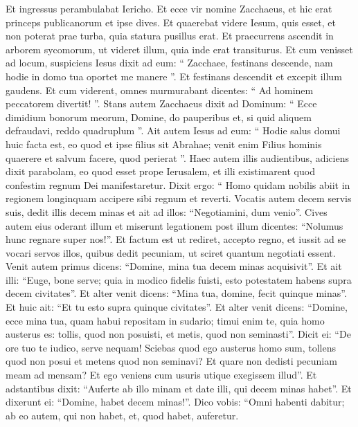 \begin{biblechapter}
\begin{biblechapter}
\begin{biblechapter}
\begin{biblechapter}
\begin{biblechapter}
\begin{biblechapter}
\begin{biblechapter}
\begin{biblechapter}
\begin{biblechapter}
\begin{biblechapter}
\begin{biblechapter}
\begin{biblechapter}
\begin{biblechapter}
\begin{biblechapter}
\begin{biblechapter}
\begin{biblechapter}
\begin{biblechapter}
\begin{biblechapter}
\begin{biblechapter}
\verse Et ingressus perambulabat Iericho. 
\verse Et ecce vir nomine Zacchaeus, et hic erat princeps publicanorum et ipse dives. 
\verse Et quaerebat videre Iesum, quis esset, et non poterat prae turba, quia statura pusillus erat. 
\verse Et praecurrens ascendit in arborem sycomorum, ut videret illum, quia inde erat transiturus. 
\verse Et cum venisset ad locum, suspiciens Iesus dixit ad eum: “ Zacchaee, festinans descende, nam hodie in domo tua oportet me manere ”. 
\verse Et festinans descendit et excepit illum gaudens. 
\verse Et cum viderent, omnes murmurabant dicentes: “ Ad hominem peccatorem divertit! ”. 
\verse Stans autem Zacchaeus dixit ad Dominum: “ Ecce dimidium bonorum meorum, Domine, do pauperibus et, si quid aliquem defraudavi, reddo quadruplum ”. 
\verse Ait autem Iesus ad eum: “ Hodie salus domui huic facta est, eo quod et ipse filius sit Abrahae; 
\verse venit enim Filius hominis quaerere et salvum facere, quod perierat ”.
 \verse Haec autem illis audientibus, adiciens dixit parabolam, eo quod esset prope Ierusalem, et illi existimarent quod confestim regnum Dei manifestaretur. 
\verse Dixit ergo: “ Homo quidam nobilis abiit in regionem longinquam accipere sibi regnum et reverti. 
\verse Vocatis autem decem servis suis, dedit illis decem minas et ait ad illos: “Negotiamini, dum venio”. 
\verse Cives autem eius oderant illum et miserunt legationem post illum dicentes: “Nolumus hunc regnare super nos!”. 
\verse Et factum est ut rediret, accepto regno, et iussit ad se vocari servos illos, quibus dedit pecuniam, ut sciret quantum negotiati essent. 
\verse Venit autem primus dicens: “Domine, mina tua decem minas acquisivit”. 
\verse Et ait illi: “Euge, bone serve; quia in modico fidelis fuisti, esto potestatem habens supra decem civitates”. 
\verse Et alter venit dicens: “Mina tua, domine, fecit quinque minas”. 
\verse Et huic ait: “Et tu esto supra quinque civitates”. 
\verse Et alter venit dicens: “Domine, ecce mina tua, quam habui repositam in sudario; 
\verse timui enim te, quia homo austerus es: tollis, quod non posuisti, et metis, quod non seminasti”. 
\verse Dicit ei: “De ore tuo te iudico, serve nequam! Sciebas quod ego austerus homo sum, tollens quod non posui et metens quod non seminavi? 
 \verse Et quare non dedisti pecuniam meam ad mensam? Et ego veniens cum usuris utique exegissem illud”. 
\verse Et adstantibus dixit: “Auferte ab illo minam et date illi, qui decem minas habet”. 
\verse Et dixerunt ei: “Domine, habet decem minas!”. 
\verse Dico vobis: “Omni habenti dabitur; ab eo autem, qui non habet, et, quod habet, auferetur. 

\end{biblechapter}
\end{biblechapter}
\end{biblechapter}
\end{biblechapter}
\end{biblechapter}
\end{biblechapter}
\end{biblechapter}
\end{biblechapter}
\end{biblechapter}
\end{biblechapter}
\end{biblechapter}
\end{biblechapter}
\end{biblechapter}
\end{biblechapter}
\end{biblechapter}
\end{biblechapter}
\end{biblechapter}
\end{biblechapter}
\end{biblechapter}

